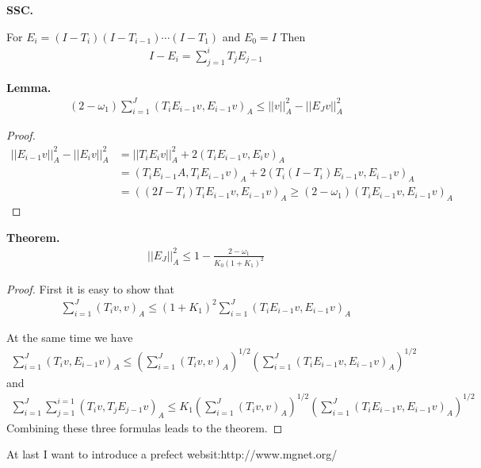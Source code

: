\documentclass[12pt]{amsart}
\begin{document}
\textbf{SSC.\\}

For $E_i=(I-T_i)(I-T_{i-1})\cdots(I-T_1)$ and $E_0=I$ Then
\begin{align*}
I-E_i=\sum_{j=1}^i T_jE_{j-1}
\end{align*}

\textbf{Lemma.}
\begin{align*}
(2-\omega_1)\sum_{i=1}^J(T_iE_{i-1}v,E_{i-1}v)_A\le \left|\left|v\right|\right|_A^2-\left|\left|E_Jv\right|\right|_A^2
\end{align*}

\begin{proof}
	\begin{align*}
	\left|\left|E_{i-1}v\right|\right|_A^2-\left|\left|E_{i}v\right|\right|_A^2 &= \left|\left|T_{i}E_{i}v\right|\right|_A^2+2(T_iE_{i-1}v,E_iv)_A\\
	&=(T_iE_{i-1}A,T_iE_{i-1}v)_A+2(T_i(I-T_i)E_{i-1}v,E_{i-1}v)_A\\
	&=((2I-T_i)T_iE_{i-1}v,E_{i-1}v)_A\ge (2-\omega_1)(T_iE_{i-1}v,E_{i-1}v)_A
	\end{align*}
\end{proof}


\textbf{Theorem.}
\begin{align*}
\left|\left|E_J\right|\right|_A^2\le 1-\frac{2-\omega_1}{K_0(1+K_1)^2}
\end{align*}

\begin{proof}
	First it is easy to show that
	\begin{align*}
	\sum_{i=1}^J(T_iv,v)_A\le(1+K_1)^2\sum_{i=1}^J(T_iE_{i-1}v,E_{i-1}v)_A
	\end{align*}
	
	At the same time we have
	\begin{align*}
	\sum_{i=1}^J(T_iv,E_{i-1}v)_A\le \left(\sum_{i=1}^J(T_iv,v)_A\right)^{1/2}\left(\sum_{i=1}^J(T_iE_{i-1}v,E_{i-1}v)_A\right)^{1/2}
	\end{align*}
	and
	\begin{align*}
	\sum_{i=1}^J\sum_{j=1}^{i=1}(T_iv,T_jE_{j-1}v)_A\le K_1\left(\sum_{i=1}^J(T_iv,v)_A\right)^{1/2}\left(\sum_{i=1}^J(T_iE_{i-1}v,E_{i-1}v)_A\right)^{1/2}
	\end{align*}
	Combining these three formulas leads to the theorem.
\end{proof}

At last I want to introduce a prefect websit:http://www.mgnet.org/
\end{document}
